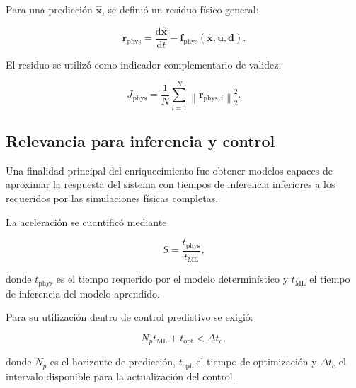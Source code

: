 Para una predicción $\hat{\mathbf{x}}$, se definió un residuo físico general:

\begin{equation}
\mathbf{r}_{\mathrm{phys}}
=
\frac{\mathrm{d}\hat{\mathbf{x}}}{\mathrm{d}t}
-
\mathbf{f}_{\mathrm{phys}}
\left(
\hat{\mathbf{x}},
\mathbf{u},
\mathbf{d}
\right).
\label{eq:residuo_fisico_modelo_hibrido}
\end{equation}

El residuo se utilizó como indicador complementario de validez:

\begin{equation}
J_{\mathrm{phys}}
=
\frac{1}{N}
\sum_{i=1}^{N}
\left\|
\mathbf{r}_{\mathrm{phys},i}
\right\|_2^2.
\label{eq:metrica_consistencia_fisica}
\end{equation}

\subsection{Relevancia para inferencia y control}
\label{subsec:relevancia_control_hybrid}

Una finalidad principal del enriquecimiento fue obtener modelos capaces de aproximar la respuesta del sistema con tiempos de inferencia inferiores a los requeridos por las simulaciones físicas completas.

La aceleración se cuantificó mediante

\begin{equation}
S
=
\frac{
t_{\mathrm{phys}}
}{
t_{\mathrm{ML}}
},
\label{eq:speedup_hibrido}
\end{equation}

donde $t_{\mathrm{phys}}$ es el tiempo requerido por el modelo determinístico y $t_{\mathrm{ML}}$ el tiempo de inferencia del modelo aprendido.

Para su utilización dentro de control predictivo se exigió:

\begin{equation}
N_p
t_{\mathrm{ML}}
+
t_{\mathrm{opt}}
<
\Delta t_c,
\label{eq:viabilidad_mpc_hibrido}
\end{equation}

donde $N_p$ es el horizonte de predicción, $t_{\mathrm{opt}}$ el tiempo de optimización y $\Delta t_c$ el intervalo disponible para la actualización del control.

